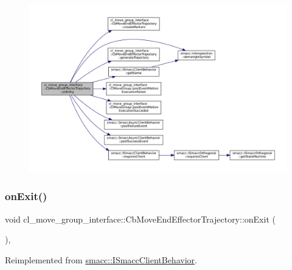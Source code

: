 \begin{figure}[H]
\begin{center}
\leavevmode
\includegraphics[width=350pt]{classcl__move__group__interface_1_1CbMoveEndEffectorTrajectory_aaedd074fd178c6390a4a3f1ccff23ad3_cgraph}
\end{center}
\end{figure}
\mbox{\label{classcl__move__group__interface_1_1CbMoveEndEffectorTrajectory_a4952c092e69bc6e9831568de32888da5}} 
\subsubsection{\texorpdfstring{on\+Exit()}{onExit()}}
{\footnotesize\ttfamily void cl\+\_\+move\+\_\+group\+\_\+interface\+::\+Cb\+Move\+End\+Effector\+Trajectory\+::on\+Exit (\begin{DoxyParamCaption}{ }\end{DoxyParamCaption})\hspace{0.3cm}{\ttfamily [override]}, {\ttfamily [virtual]}}



Reimplemented from \hyperlink{classsmacc_1_1ISmaccClientBehavior_a36bf771905e3bf750909a15e4215a9b3}{smacc\+::\+I\+Smacc\+Client\+Behavior}.



